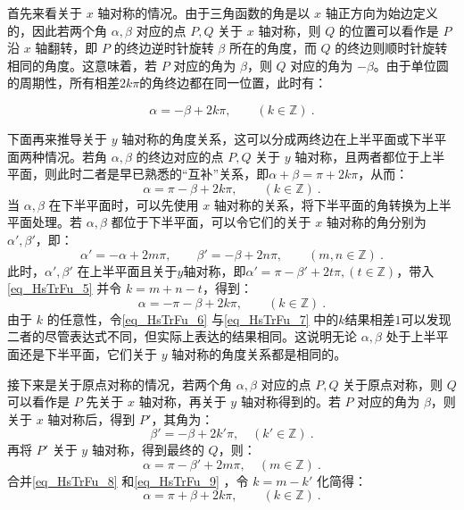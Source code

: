首先来看关于 $x$ 轴对称的情况。由于三角函数的角是以 $x$ 轴正方向为始边定义的，因此若两个角 $\alpha, \beta$ 对应的点 $P, Q$ 关于 $x$ 轴对称，则 $Q$ 的位置可以看作是 $P$ 沿 $x$ 轴翻转，即 $P$ 的终边逆时针旋转 $\beta$ 所在的角度，而 $Q$ 的终边则顺时针旋转相同的角度。这意味着，若 $P$ 对应的角为 $\beta$，则 $Q$ 对应的角为 $-\beta$。由于单位圆的周期性，所有相差$2k\pi$的角终边都在同一位置，此时有：

\begin{equation}\label{eq_HsTrFu_5}
\alpha = -\beta + 2k\pi, \qquad (k\in\mathbb{Z})~.
\end{equation}

下面再来推导关于 $y$ 轴对称的角度关系，这可以分成两终边在上半平面或下半平面两种情况。若角 $\alpha, \beta$ 的终边对应的点 $P, Q$ 关于 $y$ 轴对称，且两者都位于上半平面，则此时二者是早已熟悉的“互补”关系，即$\alpha+\beta=\pi+2k\pi$，从而：
\begin{equation}\label{eq_HsTrFu_7}
\alpha = \pi-\beta + 2k\pi, \qquad (k\in\mathbb{Z})~.
\end{equation}
当 $\alpha, \beta$ 在下半平面时，可以先使用 $x$ 轴对称的关系，将下半平面的角转换为上半平面处理。若 $\alpha, \beta$ 都位于下半平面，可以令它们的关于 $x$ 轴对称的角分别为 $\alpha', \beta'$，即：
\begin{equation}
\alpha'= -\alpha + 2m\pi, \qquad \beta' = -\beta + 2n\pi, \qquad (m,n\in\mathbb{Z})~.
\end{equation}
此时，$\alpha', \beta'$ 在上半平面且关于$y$轴对称，即$\alpha'=\pi-\beta'+2t\pi, (t\in\mathbb{Z})$，带入\autoref{eq_HsTrFu_5} 并令 $k = m+n-t$，得到：
\begin{equation}
\alpha = -\pi-\beta + 2k\pi, \qquad (k\in\mathbb{Z})~.
\end{equation}
由于 $k$ 的任意性，令\autoref{eq_HsTrFu_6} 与\autoref{eq_HsTrFu_7} 中的$k$结果相差$1$可以发现二者的尽管表达式不同，但实际上表达的结果相同。这说明无论 $\alpha, \beta$ 处于上半平面还是下半平面，它们关于 $y$ 轴对称的角度关系都是相同的。

接下来是关于原点对称的情况，若两个角 $\alpha, \beta$ 对应的点 $P, Q$ 关于原点对称，则 $Q$ 可以看作是 $P$ 先关于 $x$ 轴对称，再关于 $y$ 轴对称得到的。若 $P$ 对应的角为 $\beta$，则关于 $x$ 轴对称后，得到 $P'$，其角为：
\begin{equation}\label{eq_HsTrFu_8}
\beta'= -\beta + 2k'\pi, \quad (k'\in\mathbb{Z})~.
\end{equation}
再将 $P'$ 关于 $y$ 轴对称，得到最终的 $Q$，则：
\begin{equation}\label{eq_HsTrFu_9}
\alpha = \pi - \beta' + 2m\pi, \quad (m\in\mathbb{Z})~.
\end{equation}
合并\autoref{eq_HsTrFu_8} 和\autoref{eq_HsTrFu_9} ，令 $k =  m-k' $ 化简得：
\begin{equation}
\alpha = \pi + \beta + 2k\pi, \qquad (k\in\mathbb{Z})~.
\end{equation}

